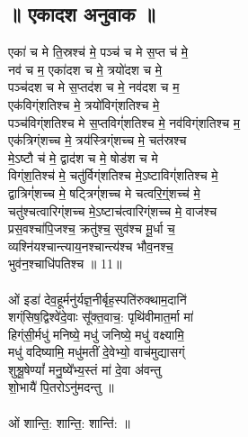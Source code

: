 \subsection{॥ एकादश अनुवाक ॥}
एका॑ च मे ति॒स्रश्च॑ मे॒ पञ्च॑ च मे स॒प्त च॑ मे॒\\
नव॑ च म॒ एका॑दश च मे॒ त्रयो॑दश च मे॒\\
पञ्च॑दश च मे स॒प्तद॑श च मे॒ नव॑दश च म॒\\
एक॑विग्ंशतिश्च मे॒ त्रयो॑विग्ंशतिश्च मे॒\\
पञ्च॑विग्ंशतिश्च मे स॒प्तविग्ं॑शतिश्च मे॒ नव॑विग्ंशतिश्च म॒\\
एक॑त्रिग्ंशच्च मे॒ त्रय॑स्त्रिग्ंशच्च मे॒ चत॑स्रश्च\\
मे॒ऽष्टौ च॑ मे॒ द्वाद॑श च मे॒ षोड॑श च मे\\
विग्ंश॒तिश्च॑ मे॒ चतु॑र्विग्ंशतिश्च मे॒ऽष्टाविग्ं॑शतिश्च मे॒\\
द्वात्रिग्ं॑शच्च मे॒ षट्त्रिग्ं॑शच्च मे चत्वरि॒ग्ं॒शच्च॑ मे॒\\
चतु॑श्चत्वारिग्ंशच्च मे॒ऽष्टाच॑त्वारिग्ंशच्च मे॒ वाज॑श्च\\
प्रस॒वश्चा॑पि॒जश्च॒ क्रतु॑श्च॒ सुव॑श्च मू॒र्धा च॒\\
व्यश्नि॑यश्चान्त्याय॒नश्चान्त्य॑श्च भौव॒नश्च॒\\
भुव॑न॒श्चाधि॑पतिश्च ॥ 11॥\\
\\
ओं इडा॑ देव॒हूर्मनु॑र्यज्ञ॒नीर्बृह॒स्पति॑रुक्थाम॒दानि॑\\
शग्ंसिष॒द्विश्वे॑दे॒वाः सू᳚क्त॒वाच॒: पृथि॑वीमात॒र्मा मा॑\\
हिग्ंसी॒र्मधु॑ मनिष्ये॒ मधु॑ जनिष्ये॒ मधु॑ वक्ष्यामि॒\\
मधु॑ वदिष्यामि॒ मधु॑मतीं दे॒वेभ्यो॒ वाच॑मुद्यासग्ं\\
शुश्रू॒षेण्यां᳚ मनु॒ष्ये᳚भ्य॒स्तं मा॑ दे॒वा अ॑वन्तु\\
शो॒भायै॑ पि॒तरोऽनु॑मदन्तु ॥\\
\\
ओं शान्ति॒: शान्ति॒: शान्ति॑: ॥\\
